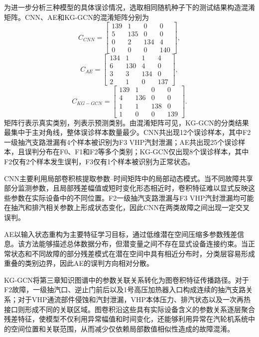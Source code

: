 为进一步分析三种模型的具体误诊情况，选取相同随机种子下的测试结果构造混淆矩阵。CNN、AE和KG-GCN的混淆矩阵分别为
\begin{equation}
C_{CNN}=\begin{bmatrix}
139&1&0&0\\
5&135&0&0\\
0&2&134&4\\
0&0&0&140
\end{bmatrix},
\end{equation}
\begin{equation}
C_{AE}=\begin{bmatrix}
134&1&1&4\\
6&130&4&0\\
3&3&134&0\\
2&1&0&137
\end{bmatrix},
\end{equation}
\begin{equation}
C_{KG-GCN}=\begin{bmatrix}
139&1&0&0\\
4&136&0&0\\
1&1&138&0\\
1&0&0&139
\end{bmatrix}.
\end{equation}
矩阵行表示真实类别，列表示预测类别。由混淆矩阵可见，KG-GCN的分类结果最集中于主对角线，整体误诊样本数量最少。CNN共出现12个误诊样本，其中F2一级抽汽支路泄漏有4个样本被识别为F3 VHP汽封泄漏；AE共出现25个误诊样本，且误判分布在F0、F1和F2等多个类别；KG-GCN仅出现8个误诊样本，其中F2仅有2个样本发生误判，F3仅有1个样本被识别为正常状态。

CNN主要利用局部卷积核提取参数--时间矩阵中的局部动态模式。当不同故障共享部分监测参数，且局部残差幅值或短时变化形态相近时，卷积特征难以显式反映这些参数在实际设备中的不同位置。F2一级抽汽支路泄漏与F3 VHP汽封泄漏均可能在抽汽和排汽相关参数上形成状态变化，因此CNN在两类故障之间出现一定交叉误判。

AE以输入状态重构为主要特征学习目标，通过低维潜在空间压缩多参数残差信息。该方法能够描述总体数据分布，但潜变量之间不存在显式设备连接约束。当正常状态和不同故障的部分残差模式在潜在空间中具有相近分布时，分类层容易形成重叠的类别边界，因此AE的误判方向相对分散。

KG-GCN将第三章知识图谱中的参数关联关系转化为图卷积特征传播路径。对于F2故障，一级抽汽口、逆止门前后以及1号高压加热器入口构成连续的抽汽支路关系；对于VHP通流部件侵蚀和汽封泄漏，VHP本体压力、排汽状态以及一次再热接口则形成不同的关联区域。图卷积沿这些具有实际设备含义的参数关系逐层聚合残差特征，使模型不仅利用异常幅值和时间变化，还能够利用异常在汽轮机系统中的空间位置和关联范围，从而减少仅依赖局部数值相似性造成的故障混淆。

